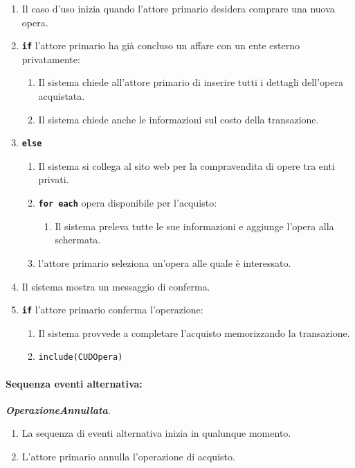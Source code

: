\documentclass{article}
\begin{document}
		\begin{enumerate}[itemsep=8pt,parsep=0pt]
		
		\item Il caso d’uso inizia quando l’attore primario desidera comprare una nuova opera.

		\item \texttt{\textbf{if}} l'attore primario ha già concluso un affare con un ente esterno privatamente:
			\begin{enumerate}	[leftmargin=28pt]
				\item Il sistema chiede all'attore primario di inserire tutti i dettagli dell'opera acquistata.
				\item Il sistema chiede anche le informazioni sul costo della transazione.
			\end{enumerate}
		\item \texttt{\textbf{else}}
			\begin{enumerate}	[leftmargin=28pt]
		        \item Il sistema si collega al sito web per la compravendita di opere tra enti privati.
					\item \texttt{\textbf{for each}} opera disponibile per l'acquisto:
						\begin{enumerate}	[leftmargin=28pt]
							\item Il sistema preleva tutte le sue informazioni e aggiunge l'opera alla schermata.
						\end{enumerate}
			\item l'attore primario seleziona un'opera alle quale è interessato.
			\end{enumerate}

		    \item  Il sistema mostra un messaggio di conferma.
		    \item \texttt{\textbf{if}}  l'attore primario conferma l'operazione:
		        \begin{enumerate}	[leftmargin=28pt]
		        \item  Il sistema provvede a completare l'acquisto memorizzando la transazione.
		        \item \texttt{{include(CUDOpera)}}
		        \end{enumerate}
\end{enumerate}
	
	\paragraph{Sequenza eventi alternativa:} \textbf{\textit{OperazioneAnnullata}}.
	\begin{enumerate}[itemsep=8pt,parsep=0pt]
	\item La sequenza di eventi alternativa inizia in qualunque momento.
	\item L'attore primario annulla l'operazione di acquisto.
	\end{enumerate}
\end{document}
